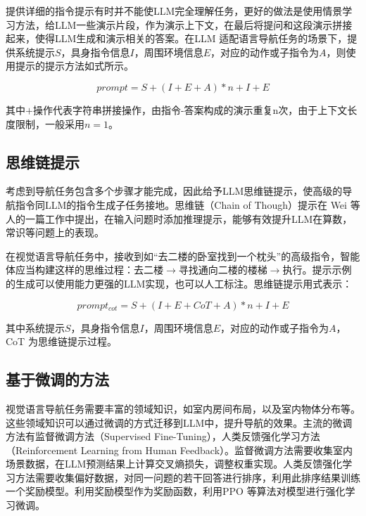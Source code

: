 \documentclass[bachelor]{thesis-uestc}
\begin{document}
提供详细的指令提示有时并不能使LLM完全理解任务，更好的做法是使用情景学习方法，给LLM一些演示片段，作为演示上下文，在最后将提问和这段演示拼接起来，使得LLM生成和演示相关的答案。在LLM 适配语言导航任务的场景下，提供系统提示$S$，具身指令信息$I$，周围环境信息$E$，对应的动作或子指令为$A$，则使用提示的提示方法如式所示。

\begin{equation}
    prompt=S+(I+E+A)*n+I+E
\label{icl}
\end{equation}

其中$+$操作代表字符串拼接操作，由指令-答案构成的演示重复n次，由于上下文长度限制，一般采用$n=1$。

\subsection{思维链提示}

考虑到导航任务包含多个步骤才能完成，因此给予LLM思维链提示，使高级的导航指令同LLM的指令生成子任务接地。思维链（Chain of Though）提示在 Wei 等人\cite{weiChainofThoughtPromptingElicits2023}的一篇工作中提出，在输入问题时添加推理提示，能够有效提升LLM在算数，常识等问题上的表现。

在视觉语言导航任务中，接收到如“去二楼的卧室找到一个枕头”的高级指令，智能体应当构建这样的思维过程：去二楼$\rightarrow$寻找通向二楼的楼梯$\rightarrow$执行。提示示例的生成可以使用能力更强的LLM实现，也可以人工标注。思维链提示用式表示：

\begin{equation}
    prompt_{cot} = S+(I+E+CoT+A)*n+I+E
\label{cot}
\end{equation}

其中系统提示$S$，具身指令信息$I$，周围环境信息$E$，对应的动作或子指令为$A$，CoT 为思维链提示过程。

\subsection{基于微调的方法}

视觉语言导航任务需要丰富的领域知识，如室内房间布局，以及室内物体分布等。这些领域知识可以通过微调的方式迁移到LLM中，提升导航的效果。主流的微调方法有监督微调方法（Supervised Fine-Tuning），人类反馈强化学习方法（Reinforcement Learning from Human Feedback）\cite{ouyangTrainingLanguageModels2022}。监督微调方法需要收集室内场景数据，在LLM预测结果上计算交叉熵损失，调整权重实现。人类反馈强化学习方法需要收集偏好数据，对同一问题的若干回答进行排序，利用此排序结果训练一个奖励模型。利用奖励模型作为奖励函数，利用PPO \cite{schulmanProximalPolicyOptimization2017}等算法对模型进行强化学习微调。
\end{document}
